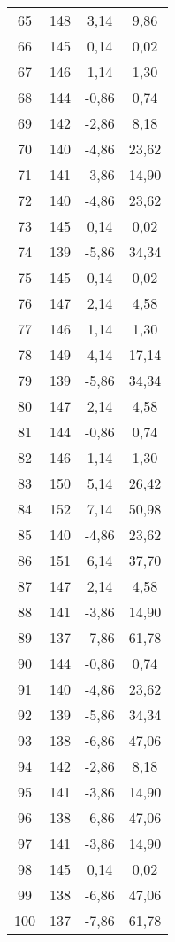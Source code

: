 \begin{xltabular}{\textwidth}{|c|c|c|c|}
65  & 148 & 3,14  & 9,86  \\
66  & 145 & 0,14  & 0,02  \\
67  & 146 & 1,14  & 1,30  \\
68  & 144 & -0,86 & 0,74  \\
69  & 142 & -2,86 & 8,18  \\
70  & 140 & -4,86 & 23,62 \\
71  & 141 & -3,86 & 14,90 \\
72  & 140 & -4,86 & 23,62 \\
73  & 145 & 0,14  & 0,02  \\
74  & 139 & -5,86 & 34,34 \\
75  & 145 & 0,14  & 0,02  \\
76  & 147 & 2,14  & 4,58  \\
77  & 146 & 1,14  & 1,30  \\
78  & 149 & 4,14  & 17,14 \\
79  & 139 & -5,86 & 34,34 \\
80  & 147 & 2,14  & 4,58  \\
81  & 144 & -0,86 & 0,74  \\
82  & 146 & 1,14  & 1,30  \\
83  & 150 & 5,14  & 26,42 \\
84  & 152 & 7,14  & 50,98 \\
85  & 140 & -4,86 & 23,62 \\
86  & 151 & 6,14  & 37,70 \\
87  & 147 & 2,14  & 4,58  \\
88  & 141 & -3,86 & 14,90 \\
89  & 137 & -7,86 & 61,78 \\
90  & 144 & -0,86 & 0,74  \\
91  & 140 & -4,86 & 23,62 \\
92  & 139 & -5,86 & 34,34 \\
93  & 138 & -6,86 & 47,06 \\
94  & 142 & -2,86 & 8,18  \\
95  & 141 & -3,86 & 14,90 \\
96  & 138 & -6,86 & 47,06 \\
97  & 141 & -3,86 & 14,90 \\
98  & 145 & 0,14  & 0,02  \\
99  & 138 & -6,86 & 47,06 \\
100 & 137 & -7,86 & 61,78 \\
\end{xltabular}

